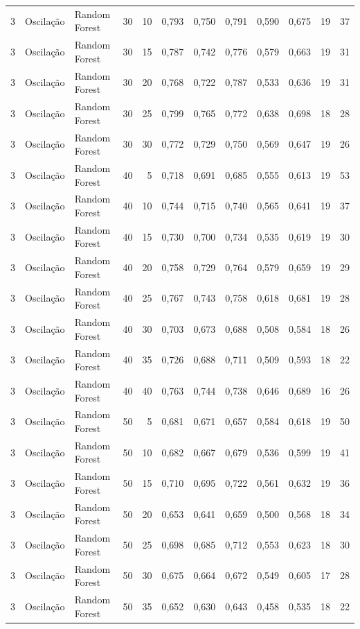 \begin{longtable}{@{}rllrrrrrrrrr@{}}
3 & Oscilação & Random Forest & 30 & 10 & 0,793 & 0,750 & 0,791 & 0,590 & 0,675 & 19 & 37 \\
3 & Oscilação & Random Forest & 30 & 15 & 0,787 & 0,742 & 0,776 & 0,579 & 0,663 & 19 & 31 \\
3 & Oscilação & Random Forest & 30 & 20 & 0,768 & 0,722 & 0,787 & 0,533 & 0,636 & 19 & 31 \\
3 & Oscilação & Random Forest & 30 & 25 & 0,799 & 0,765 & 0,772 & 0,638 & 0,698 & 18 & 28 \\
3 & Oscilação & Random Forest & 30 & 30 & 0,772 & 0,729 & 0,750 & 0,569 & 0,647 & 19 & 26 \\
3 & Oscilação & Random Forest & 40 & 5 & 0,718 & 0,691 & 0,685 & 0,555 & 0,613 & 19 & 53 \\
3 & Oscilação & Random Forest & 40 & 10 & 0,744 & 0,715 & 0,740 & 0,565 & 0,641 & 19 & 37 \\
3 & Oscilação & Random Forest & 40 & 15 & 0,730 & 0,700 & 0,734 & 0,535 & 0,619 & 19 & 30 \\
3 & Oscilação & Random Forest & 40 & 20 & 0,758 & 0,729 & 0,764 & 0,579 & 0,659 & 19 & 29 \\
3 & Oscilação & Random Forest & 40 & 25 & 0,767 & 0,743 & 0,758 & 0,618 & 0,681 & 19 & 28 \\
3 & Oscilação & Random Forest & 40 & 30 & 0,703 & 0,673 & 0,688 & 0,508 & 0,584 & 18 & 26 \\
3 & Oscilação & Random Forest & 40 & 35 & 0,726 & 0,688 & 0,711 & 0,509 & 0,593 & 18 & 22 \\
3 & Oscilação & Random Forest & 40 & 40 & 0,763 & 0,744 & 0,738 & 0,646 & 0,689 & 16 & 26 \\
3 & Oscilação & Random Forest & 50 & 5 & 0,681 & 0,671 & 0,657 & 0,584 & 0,618 & 19 & 50 \\
3 & Oscilação & Random Forest & 50 & 10 & 0,682 & 0,667 & 0,679 & 0,536 & 0,599 & 19 & 41 \\
3 & Oscilação & Random Forest & 50 & 15 & 0,710 & 0,695 & 0,722 & 0,561 & 0,632 & 19 & 36 \\
3 & Oscilação & Random Forest & 50 & 20 & 0,653 & 0,641 & 0,659 & 0,500 & 0,568 & 18 & 34 \\
3 & Oscilação & Random Forest & 50 & 25 & 0,698 & 0,685 & 0,712 & 0,553 & 0,623 & 18 & 30 \\
3 & Oscilação & Random Forest & 50 & 30 & 0,675 & 0,664 & 0,672 & 0,549 & 0,605 & 17 & 28 \\
3 & Oscilação & Random Forest & 50 & 35 & 0,652 & 0,630 & 0,643 & 0,458 & 0,535 & 18 & 22 \\

\end{longtable}

